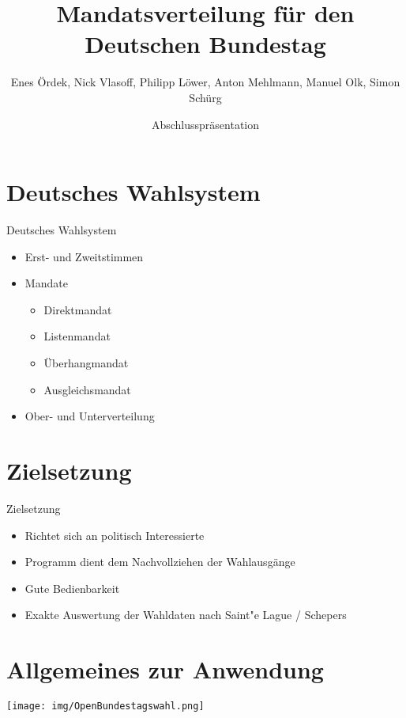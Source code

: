 \documentclass[18pt]{beamer}
\title[OpenBundestagswahl]{Mandatsverteilung für den Deutschen Bundestag}
\subtitle{Enes Ördek, Nick Vlasoff, Philipp Löwer, Anton Mehlmann, Manuel Olk, Simon Schürg}
\author{Abschlusspräsentation}
\institute{Praxis der Softwareentwicklung, WS 2013/14}
\begin{document}

\begin{frame}
\titlepage
\end{frame}



\section{Deutsches Wahlsystem}
\begin{frame}{Deutsches Wahlsystem}
\begin{itemize}
	\item Erst- und Zweitstimmen
	\item Mandate	
	\begin{itemize}
		\item Direktmandat
		\item Listenmandat
		\item Überhangmandat
		\item Ausgleichsmandat
	\end{itemize}
	\item Ober- und Unterverteilung
\end{itemize}
\end{frame}
\section{Zielsetzung}
\begin{frame}{Zielsetzung}
\begin{itemize}
\item Richtet sich an politisch Interessierte
\item Programm dient dem Nachvollziehen der Wahlausgänge
\item Gute Bedienbarkeit
\item Exakte Auswertung der Wahldaten nach Saint"e Lague / Schepers

\end{itemize}
\end{frame}

\section{Allgemeines zur Anwendung}
\begin{frame}
\begin{center}
	\texttt{[image: img/OpenBundestagswahl.png]}
\end{center}
\end{frame}
\end{document}
